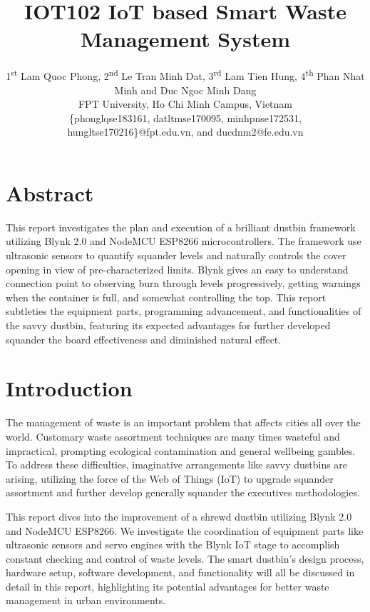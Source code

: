 \documentclass[conference, onecolumn]{IEEEtran}
\begin{document}
\title{IOT102 IoT based Smart Waste Management System\\
}

\author{
1\textsuperscript{st} Lam Quoc Phong, 2\textsuperscript{nd} Le Tran Minh Dat, 3\textsuperscript{rd} Lam Tien Hung, 4\textsuperscript{th} Phan Nhat Minh and Duc Ngoc Minh Dang\\
FPT University, Ho Chi Minh Campus, Vietnam\\
\{phonglqse183161, datltmse170095, minhpnse172531, hungltse170216\}@fpt.edu.vn, and ducdnm2@fe.edu.vn}
\maketitle

\section{Abstract}
This report investigates the plan and execution of a brilliant dustbin framework utilizing Blynk 2.0 and NodeMCU ESP8266 microcontrollers. The framework use ultrasonic sensors to quantify squander levels and naturally controls the cover opening in view of pre-characterized limits. Blynk gives an easy to understand connection point to observing burn through levels progressively, getting warnings when the container is full, and somewhat controlling the top. This report subtleties the equipment parts, programming advancement, and functionalities of the savvy dustbin, featuring its expected advantages for further developed squander the board effectiveness and diminished natural effect.


\section{Introduction}
The management of waste is an important problem that affects cities all over the world. Customary waste assortment techniques are many times wasteful and impractical, prompting ecological contamination and general wellbeing gambles. To address these difficulties, imaginative arrangements like savvy dustbins are arising, utilizing the force of the Web of Things (IoT) to upgrade squander assortment and further develop generally squander the executives methodologies.

This report dives into the improvement of a shrewd dustbin utilizing Blynk 2.0 and NodeMCU ESP8266. We investigate the coordination of equipment parts like ultrasonic sensors and servo engines with the Blynk IoT stage to accomplish constant checking and control of waste levels. The smart dustbin's design process, hardware setup, software development, and functionality will all be discussed in detail in this report, highlighting its potential advantages for better waste management in urban environments.
\end{document}
